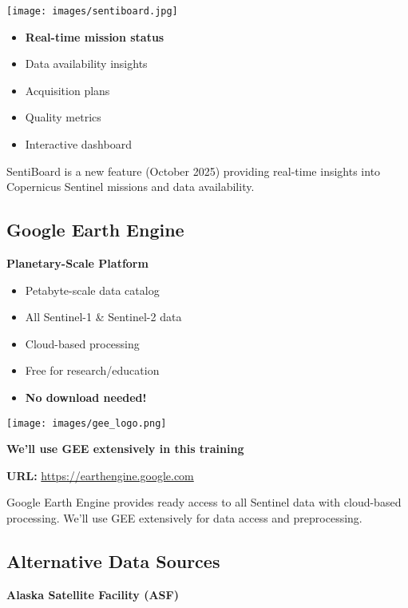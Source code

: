 \documentclass[
  letterpaper,
  DIV=11,
  numbers=noendperiod]{scrartcl}
\providecommand{\tightlist}{%
  \setlength{\itemsep}{0pt}\setlength{\parskip}{0pt}}
\begin{document}
\begin{center}
\texttt{[image: images/sentiboard.jpg]}
\end{center}

\begin{itemize}
\tightlist
\item
  \textbf{Real-time mission status}
\item
  Data availability insights
\item
  Acquisition plans
\item
  Quality metrics
\item
  Interactive dashboard
\end{itemize}

SentiBoard is a new feature (October 2025) providing real-time insights
into Copernicus Sentinel missions and data availability.

\subsection{Google Earth Engine}\label{google-earth-engine}

\textbf{Planetary-Scale Platform}

\begin{itemize}
\tightlist
\item
  Petabyte-scale data catalog
\item
  All Sentinel-1 \& Sentinel-2 data
\item
  Cloud-based processing
\item
  Free for research/education
\item
  \textbf{No download needed!}
\end{itemize}

\texttt{[image: images/gee\_logo.png]}

\textbf{We'll use GEE extensively in this training}

\textbf{URL:} \url{https://earthengine.google.com}

Google Earth Engine provides ready access to all Sentinel data with
cloud-based processing. We'll use GEE extensively for data access and
preprocessing.

\subsection{Alternative Data Sources}\label{alternative-data-sources}

\textbf{Alaska Satellite Facility (ASF)}
\end{document}
